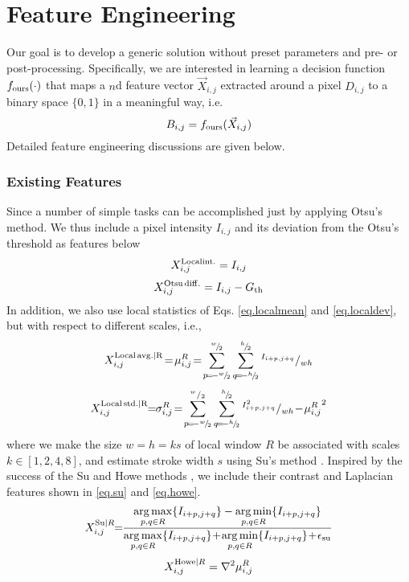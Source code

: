 \documentclass[onecolumn,11pt,draftcls,journal]{IEEEtran}
\DeclareMathOperator*{\argmin}{arg\,min}
\DeclareMathOperator*{\argmax}{arg\,max}
\begin{document}
\section{Feature Engineering}
Our goal is to develop a generic solution without preset parameters and pre- or post-processing. Specifically, we are interested in learning a decision function $f_{\rm{ours}}(\cdot)$ that maps a $n$d feature vector $\vec{X}_{i,j}$ extracted around a pixel $D_{i,j}$ to a binary space $\{0,1\}$ in a meaningful way, i.e.
\begin{equation}
B_{i,j}=f_{\rm{ours}}(\vec{X}_{i,j})
\label{eq.binours}
\end{equation}
Detailed feature engineering discussions are given below.

\subsubsection{Existing Features}
Since a number of simple tasks can be accomplished just by applying Otsu's method. We thus include a pixel intensity $I_{i,j}$ and its deviation from the Otsu's threshold as features below
\begin{equation}
X_{i,j}^{\rm{Local int.}} = I_{i,j}
\end{equation}
\begin{equation}
X_{i,j}^{\rm{Otsu\,diff.}} = I_{i,j} - G_{\rm{th}}
\end{equation}
In addition, we also use local statistics of Eqs. \eqref{eq.localmean} and \eqref{eq.localdev}, but with respect to different scales, i.e.,
\begin{equation}\label{eq.localmean}
X_{i,j}^{\rm{Local\,avg.}|R}\!=\!\mu_{i,j}^{R}\!=\!\sum_{p\!=\!-^{w}\!/\!_{2}}^{^{w}\!/\!_{2}}\sum_{q\!=\!-^{h}\!/\!_{2}}^{^{h}\!/\!_{2}}{^{I_{i+p,j+q}}/_{wh}}
\end{equation}
\begin{equation}\label{eq.localdev}
X_{i,j}^{\rm{Local\,std.}|R} \!\!=\!\!\sigma_{i,j}^{R}\!=\!\sum_{p\!=\!-^{w}\!/\!_{2}}^{^{w}/_{2}}\sum_{q\!=\!-^{h}\!/\!_{2}}^{^{h}\!/\!_{2}}{^{I_{i+p,j+q}^2}/_{ wh}} \!-\!{\mu^R_{i,j}}^2
\end{equation}
where we make the size $w\!\!=\!\!h\!\!=\!\!ks$  of local window $R$ be associated with scales $k\in[1,2,4,8]$, and estimate stroke width $s$ using Su's method \cite{Su2013}. Inspired by the success of the Su \cite{Su2009,Su2013} and Howe methods \cite{Howe2011,Howe2013}, we include their contrast and Laplacian features shown in \eqref{eq.su} and \eqref{eq.howe}. %
\begin{equation}
X_{i,j}^{{\rm{Su}}|R}\!\!=\!\!{{\displaystyle\argmax_{p,q\in R}\{I_{i+p,j+q}\}-\displaystyle\argmin_{p,q\in R}\{I_{i+p,j+q}\}}\over{{\displaystyle\argmax_{p,q\in R}\{I_{i+p,j+q}\}\!+\!\displaystyle\argmin_{p,q\in R}\{I_{i+p,j+q}\}}}\!+\!\epsilon_{\rm{su}}}
\label{eq.su}
\end{equation}
\begin{equation}
X_{i,j}^{{\rm{Howe}}|R}=\nabla^2\mu_{i,j}^{R}
\label{eq.howe}
\end{equation}
\end{document}

